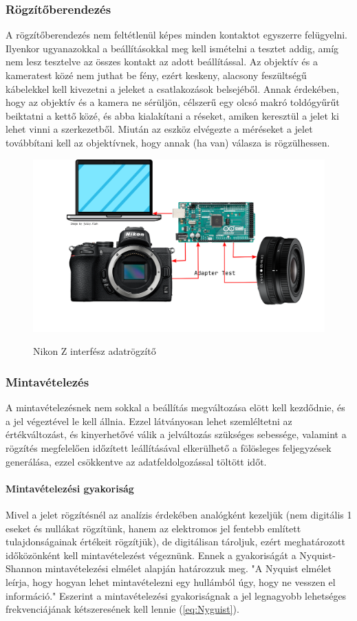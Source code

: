 \subsubsection{Rögzítőberendezés}
A rögzítőberendezés nem feltétlenül képes minden kontaktot egyszerre felügyelni. Ilyenkor ugyanazokkal a beállításokkal meg kell ismételni a tesztet addig, amíg nem lesz tesztelve az összes kontakt az adott beállítással. Az objektív és a kameratest közé nem juthat be fény, ezért keskeny, alacsony feszültségű kábelekkel kell kivezetni a jeleket a csatlakozások belsejéből. Annak érdekében, hogy az objektív és a kamera ne sérüljön, célszerű egy olcsó makró toldógyűrűt beiktatni a kettő közé, és abba kialakítani a réseket, amiken keresztül a jelet ki lehet vinni a szerkezetből. Miután az eszköz elvégezte a méréseket a jelet továbbítani kell az objektívnek, hogy annak (ha van) válasza is rögzülhessen.
\begin{figure}[H]
	\centering
	\includegraphics[width=0.9\linewidth]{img/rajz.png}
    \cite{Nikon_Z}\cite{Nikon_Z_16-50}
	\caption{Nikon Z interfész adatrögzítő}
	\label{fig:rogzito}
\end{figure}
\subsubsection{Mintavételezés}
A mintavételezésnek nem sokkal a beállítás megváltozása elött kell kezdődnie, és a jel végeztével le kell állnia. Ezzel látványosan lehet szemléltetni az értékváltozást, és kinyerhetővé válik a jelváltozás szükséges sebessége, valamint a rögzítés megfelelően időzített leállításával elkerülhető a fölösleges feljegyzések generálása, ezzel csökkentve az adatfeldolgozással töltött időt.
\paragraph{Mintavételezési gyakoriság}
Mivel a jelet rögzítésnél az analízis érdekében analógként kezeljük (nem digitális 1 eseket és nullákat rögzítünk, hanem az elektromos jel fentebb említett tulajdonságainak értékeit rögzítjük), de digitálisan tároljuk, ezért meghatározott időközönként kell mintavételezést végeznünk. Ennek a gyakoriságát a Nyquist-Shannon mintavételezési elmélet alapján határozzuk meg. "A Nyquist elmélet leírja, hogy hogyan lehet mintavételezni egy hullámból úgy, hogy ne vesszen el információ."\cite{por2019nyquist} Eszerint a mintavételezési gyakoriságnak a jel legnagyobb lehetséges frekvenciájának kétszeresének kell lennie (\ref{eq:Nyguist})\cite{por2019nyquist}.

